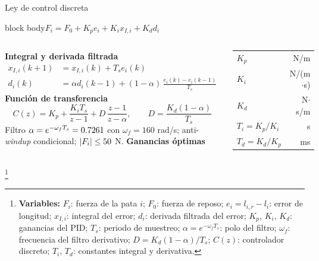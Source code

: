 \documentclass[aspectratio=169,10pt]{beamer}
\newcommand{\variables}[1]{\begingroup\renewcommand{\thefootnote}{}\footnote[frame]{\textbf{Variables:} #1}\addtocounter{footnote}{-1}\endgroup}
\newcommand{\resultado}[1]{\par\smallskip\begin{beamercolorbox}[rounded=true,sep=0.45em,center]{block body}#1\end{beamercolorbox}\par\smallskip}
\begin{document}
\begin{frame}{Ley de control discreta}
\small
\resultado{$F_i = F_0 + K_pe_i + K_ix_{I,i} + K_dd_i$}
\begin{columns}[T]
\textbf{Integral y derivada filtrada}
\begin{align*}
x_{I,i}(k+1) &= x_{I,i}(k) + T_se_i(k)\\
d_i(k) &= \alpha d_i(k-1) + (1 - \alpha)\,\frac{e_i(k) - e_i(k-1)}{T_s}
\end{align*}
\textbf{Función de transferencia}
\[
C(z) = K_p + \frac{K_iT_s}{z - 1} + D\,\frac{z - 1}{z - \alpha},\qquad D = \frac{K_d(1 - \alpha)}{T_s}
\]
Filtro $\alpha = e^{-\omega_fT_s} = 0.7261$ con $\omega_f = 160$ rad/s; anti-\emph{windup} condicional; $|F_i|\le50$ N.
\textbf{Ganancias óptimas}
\begin{center}
\footnotesize
\begin{tabular}{@{}lr@{}}
\toprule
$K_p$ & \KpOpt{} N/m \\
$K_i$ & \KiOpt{} N/(m$\cdot$s) \\
$K_d$ & \KdOpt{} N$\cdot$s/m \\
\midrule
$T_i = K_p/K_i$ & \TiOpt{} s \\
$T_d = K_d/K_p$ & \TdOpt{} ms \\
\bottomrule
\end{tabular}
\end{center}
\end{columns}
\variables{$F_i$: fuerza de la pata $i$; $F_0$: fuerza de reposo; $e_i = l_{i,r} - l_i$: error de longitud; $x_{I,i}$: integral del error; $d_i$: derivada filtrada del error; $K_p$, $K_i$, $K_d$: ganancias del PID; $T_s$: periodo de muestreo; $\alpha = e^{-\omega_fT_s}$: polo del filtro; $\omega_f$: frecuencia del filtro derivativo; $D = K_d(1 - \alpha)/T_s$; $C(z)$: controlador discreto; $T_i$, $T_d$: constantes integral y derivativa.}
\end{frame}
\end{document}

